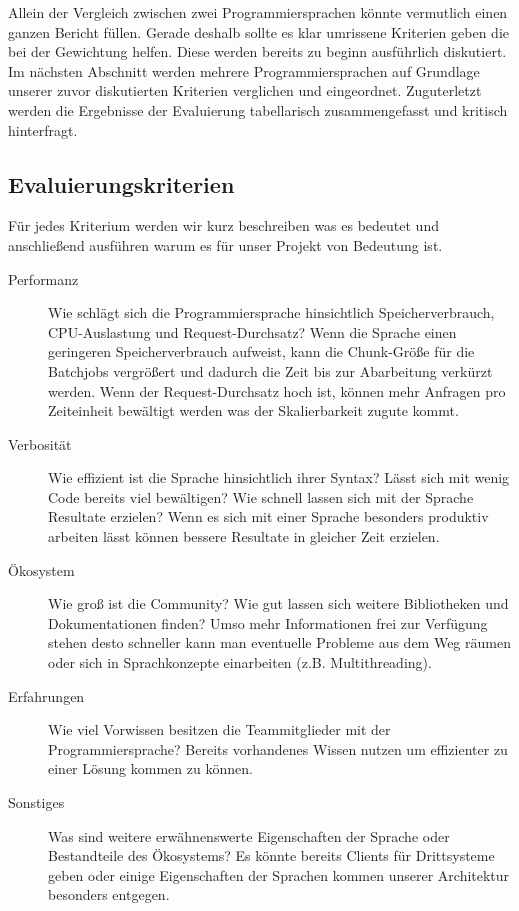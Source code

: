 Allein der Vergleich zwischen zwei Programmiersprachen könnte vermutlich einen ganzen Bericht füllen. Gerade deshalb sollte es klar umrissene Kriterien geben die bei der Gewichtung helfen. Diese werden bereits zu beginn ausführlich diskutiert.
Im nächsten Abschnitt werden mehrere Programmiersprachen auf Grundlage unserer zuvor diskutierten Kriterien verglichen und eingeordnet.
Zuguterletzt werden die Ergebnisse der Evaluierung tabellarisch zusammengefasst und kritisch hinterfragt.

\subsection{Evaluierungskriterien}
Für jedes Kriterium werden wir kurz beschreiben was es bedeutet und anschließend ausführen warum es für unser Projekt von Bedeutung ist.
\begin{description}
    \item [Performanz]
    Wie schlägt sich die Programmiersprache hinsichtlich Speicherverbrauch, CPU-Auslastung und Request-Durchsatz?
    Wenn die Sprache einen geringeren Speicherverbrauch aufweist, kann die Chunk-Größe für die Batchjobs vergrößert und dadurch die Zeit bis zur Abarbeitung verkürzt werden.
    Wenn der Request-Durchsatz hoch ist, können mehr Anfragen pro Zeiteinheit bewältigt werden was der Skalierbarkeit zugute kommt.
    \item [Verbosität]
    Wie effizient ist die Sprache hinsichtlich ihrer Syntax? Lässt sich mit wenig Code bereits viel bewältigen? Wie schnell lassen sich mit der Sprache Resultate erzielen?
    Wenn es sich mit einer Sprache besonders produktiv arbeiten lässt können bessere Resultate in gleicher Zeit erzielen.
    \item [Ökosystem]
    Wie groß ist die Community? Wie gut lassen sich weitere Bibliotheken und Dokumentationen finden?
    Umso mehr Informationen frei zur Verfügung stehen desto schneller kann man eventuelle Probleme aus dem Weg räumen oder sich in Sprachkonzepte einarbeiten (z.B. Multithreading).
    \item [Erfahrungen]
    Wie viel Vorwissen besitzen die Teammitglieder mit der Programmiersprache?
    Bereits vorhandenes Wissen nutzen um effizienter zu einer Lösung kommen zu können.
    \item [Sonstiges]
    Was sind weitere erwähnenswerte Eigenschaften der Sprache oder Bestandteile des Ökosystems?
    Es könnte bereits Clients für Drittsysteme geben oder einige Eigenschaften der Sprachen kommen unserer Architektur besonders entgegen.
\end{description}

